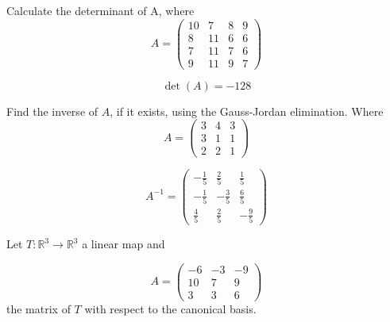 \begin{questions}

\question Calculate the determinant of A, where
$$
A=\left(\begin{array}{rrrr}
10 & 7 & 8 & 9 \\
8 & 11 & 6 & 6 \\
7 & 11 & 7 & 6 \\
9 & 11 & 9 & 7
\end{array}\right)
$$

\begin{solution}
$$\det(A)=-128$$
\end{solution}

\question Find the inverse of $A$, if it exists, using the Gauss-Jordan elimination. Where
$$
A=\left(\begin{array}{rrr}
3 & 4 & 3 \\
3 & 1 & 1 \\
2 & 2 & 1
\end{array}\right)
$$

\begin{solution}
$$A^{-1}=\left(\begin{array}{rrr}
-\frac{1}{5} & \frac{2}{5} & \frac{1}{5} \\
-\frac{1}{5} & -\frac{3}{5} & \frac{6}{5} \\
\frac{4}{5} & \frac{2}{5} & -\frac{9}{5}
\end{array}\right)$$
\end{solution}

\question Let $T:\mathbb{R}^3\rightarrow\mathbb{R}^3$  a linear map and
 
$$
A=\left(\begin{array}{rrr}
-6 & -3 & -9 \\
10 & 7 & 9 \\
3 & 3 & 6
\end{array}\right)
$$
the matrix of $T$ with respect to the canonical basis.
\end{questions}
